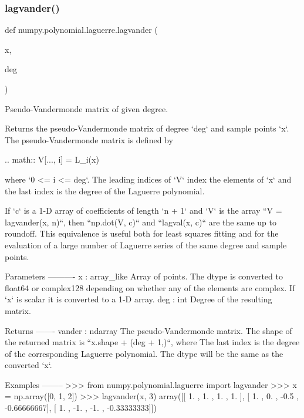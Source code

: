 \subsubsection{\texorpdfstring{lagvander()}{lagvander()}}
{\footnotesize\ttfamily def numpy.\+polynomial.\+laguerre.\+lagvander (\begin{DoxyParamCaption}\item[{}]{x,  }\item[{}]{deg }\end{DoxyParamCaption})}

\begin{DoxyVerb}Pseudo-Vandermonde matrix of given degree.

Returns the pseudo-Vandermonde matrix of degree `deg` and sample points
`x`. The pseudo-Vandermonde matrix is defined by

.. math:: V[..., i] = L_i(x)

where `0 <= i <= deg`. The leading indices of `V` index the elements of
`x` and the last index is the degree of the Laguerre polynomial.

If `c` is a 1-D array of coefficients of length `n + 1` and `V` is the
array ``V = lagvander(x, n)``, then ``np.dot(V, c)`` and
``lagval(x, c)`` are the same up to roundoff. This equivalence is
useful both for least squares fitting and for the evaluation of a large
number of Laguerre series of the same degree and sample points.

Parameters
----------
x : array_like
    Array of points. The dtype is converted to float64 or complex128
    depending on whether any of the elements are complex. If `x` is
    scalar it is converted to a 1-D array.
deg : int
    Degree of the resulting matrix.

Returns
-------
vander : ndarray
    The pseudo-Vandermonde matrix. The shape of the returned matrix is
    ``x.shape + (deg + 1,)``, where The last index is the degree of the
    corresponding Laguerre polynomial.  The dtype will be the same as
    the converted `x`.

Examples
--------
>>> from numpy.polynomial.laguerre import lagvander
>>> x = np.array([0, 1, 2])
>>> lagvander(x, 3)
array([[ 1.        ,  1.        ,  1.        ,  1.        ],
       [ 1.        ,  0.        , -0.5       , -0.66666667],
       [ 1.        , -1.        , -1.        , -0.33333333]])\end{DoxyVerb}
 \mbox{\label{namespacenumpy_1_1polynomial_1_1laguerre_a0b846b15382955c8fd4a133d8268610f}} 
